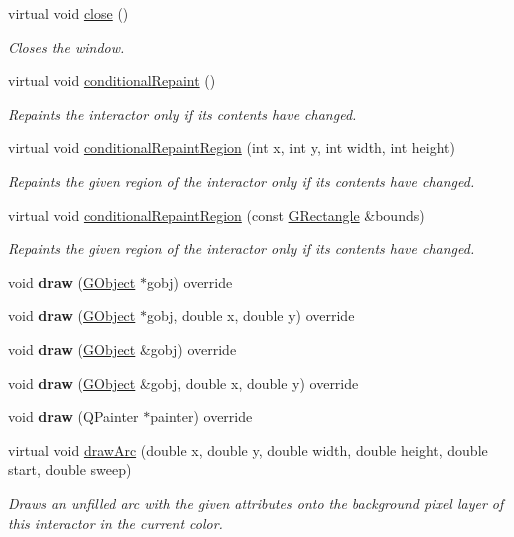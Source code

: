 \begin{DoxyCompactItemize}
virtual void \mbox{\hyperlink{classsgl_1_1GWindow_a5ae591df94fc66ccb85cbb6565368bca}{close}} ()
\begin{DoxyCompactList}\small\item\em Closes the window. \end{DoxyCompactList}\item 
virtual void \mbox{\hyperlink{classsgl_1_1GDrawingSurface_a221b3e75bb3d9d0bfea62b3364e6773b}{conditional\+Repaint}} ()
\begin{DoxyCompactList}\small\item\em Repaints the interactor only if its contents have changed. \end{DoxyCompactList}\item 
virtual void \mbox{\hyperlink{classsgl_1_1GDrawingSurface_aedd4b792311d946eeaf44b0de337a408}{conditional\+Repaint\+Region}} (int x, int y, int width, int height)
\begin{DoxyCompactList}\small\item\em Repaints the given region of the interactor only if its contents have changed. \end{DoxyCompactList}\item 
virtual void \mbox{\hyperlink{classsgl_1_1GDrawingSurface_a3932a12278752db368e24fa404e446aa}{conditional\+Repaint\+Region}} (const \mbox{\hyperlink{structsgl_1_1GRectangle}{G\+Rectangle}} \&bounds)
\begin{DoxyCompactList}\small\item\em Repaints the given region of the interactor only if its contents have changed. \end{DoxyCompactList}\item 
void {\bfseries draw} (\mbox{\hyperlink{classsgl_1_1GObject}{G\+Object}} $\ast$gobj) override
\item 
void {\bfseries draw} (\mbox{\hyperlink{classsgl_1_1GObject}{G\+Object}} $\ast$gobj, double x, double y) override
\item 
void {\bfseries draw} (\mbox{\hyperlink{classsgl_1_1GObject}{G\+Object}} \&gobj) override
\item 
void {\bfseries draw} (\mbox{\hyperlink{classsgl_1_1GObject}{G\+Object}} \&gobj, double x, double y) override
\item 
void {\bfseries draw} (Q\+Painter $\ast$painter) override
\item 
virtual void \mbox{\hyperlink{classsgl_1_1GDrawingSurface_a38b6fae1045191c57092b49905068144}{draw\+Arc}} (double x, double y, double width, double height, double start, double sweep)
\begin{DoxyCompactList}\small\item\em Draws an unfilled arc with the given attributes onto the background pixel layer of this interactor in the current color. \end{DoxyCompactList}\item 

\end{DoxyCompactItemize}
